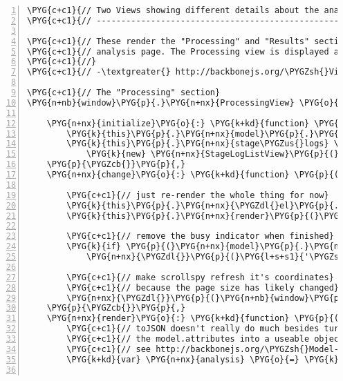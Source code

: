\begin{Verbatim}[commandchars=\\\{\},numbers=left,firstnumber=1,stepnumber=5]
\PYG{c+c1}{// Two Views showing different details about the analysis}
\PYG{c+c1}{// ------------------------------------------------------}

\PYG{c+c1}{// These render the "Processing" and "Results" section on the}
\PYG{c+c1}{// analysis page. The Processing view is displayed above the Results view.}
\PYG{c+c1}{//}
\PYG{c+c1}{// -\textgreater{} http://backbonejs.org/\PYGZsh{}View}

\PYG{c+c1}{// The "Processing" section}
\PYG{n+nb}{window}\PYG{p}{.}\PYG{n+nx}{ProcessingView} \PYG{o}{=} \PYG{n+nx}{Backbone}\PYG{p}{.}\PYG{n+nx}{View}\PYG{p}{.}\PYG{n+nx}{extend}\PYG{p}{(}\PYG{p}{\PYGZob{}}

    \PYG{n+nx}{initialize}\PYG{o}{:} \PYG{k+kd}{function} \PYG{p}{(}\PYG{p}{)} \PYG{p}{\PYGZob{}}
        \PYG{k}{this}\PYG{p}{.}\PYG{n+nx}{model}\PYG{p}{.}\PYG{n+nx}{bind}\PYG{p}{(}\PYG{l+s+s2}{"change"}\PYG{p}{,} \PYG{k}{this}\PYG{p}{.}\PYG{n+nx}{change}\PYG{p}{,} \PYG{k}{this}\PYG{p}{)}\PYG{p}{;}
        \PYG{k}{this}\PYG{p}{.}\PYG{n+nx}{stage\PYGZus{}logs} \PYG{o}{=} \PYG{p}{(}
            \PYG{k}{new} \PYG{n+nx}{StageLogListView}\PYG{p}{(}\PYG{p}{\PYGZob{}}\PYG{n+nx}{model}\PYG{o}{:} \PYG{k}{this}\PYG{p}{.}\PYG{n+nx}{model}\PYG{p}{.}\PYG{n+nx}{stage\PYGZus{}logs}\PYG{p}{\PYGZcb{}}\PYG{p}{)}\PYG{p}{.}\PYG{n+nx}{render}\PYG{p}{(}\PYG{p}{)}\PYG{p}{.}\PYG{n+nx}{el}\PYG{p}{)}\PYG{p}{;}
    \PYG{p}{\PYGZcb{}}\PYG{p}{,}
    \PYG{n+nx}{change}\PYG{o}{:} \PYG{k+kd}{function} \PYG{p}{(}\PYG{n+nx}{model}\PYG{p}{,} \PYG{n+nx}{value}\PYG{p}{,} \PYG{n+nx}{options}\PYG{p}{)} \PYG{p}{\PYGZob{}}

        \PYG{c+c1}{// just re-render the whole thing for now}
        \PYG{k}{this}\PYG{p}{.}\PYG{n+nx}{\PYGZdl{}el}\PYG{p}{.}\PYG{n+nx}{empty}\PYG{p}{(}\PYG{p}{)}\PYG{p}{;}
        \PYG{k}{this}\PYG{p}{.}\PYG{n+nx}{render}\PYG{p}{(}\PYG{p}{)}\PYG{p}{;}

        \PYG{c+c1}{// remove the busy indicator when finished}
        \PYG{k}{if} \PYG{p}{(}\PYG{n+nx}{model}\PYG{p}{.}\PYG{n+nx}{get}\PYG{p}{(}\PYG{l+s+s1}{'finished'}\PYG{p}{)}\PYG{p}{)}
            \PYG{n+nx}{\PYGZdl{}}\PYG{p}{(}\PYG{l+s+s1}{'\PYGZsh{}spinner'}\PYG{p}{)}\PYG{p}{.}\PYG{n+nx}{remove}\PYG{p}{(}\PYG{p}{)}\PYG{p}{;}

        \PYG{c+c1}{// make scrollspy refresh it's coordinates}
        \PYG{c+c1}{// because the page size has likely changed}
        \PYG{n+nx}{\PYGZdl{}}\PYG{p}{(}\PYG{n+nb}{window}\PYG{p}{)}\PYG{p}{.}\PYG{n+nx}{scrollspy}\PYG{p}{(}\PYG{l+s+s1}{'refresh'}\PYG{p}{)}\PYG{p}{;}
    \PYG{p}{\PYGZcb{}}\PYG{p}{,}
    \PYG{n+nx}{render}\PYG{o}{:} \PYG{k+kd}{function} \PYG{p}{(}\PYG{p}{)} \PYG{p}{\PYGZob{}}
        \PYG{c+c1}{// toJSON doesn't really do much besides turning}
        \PYG{c+c1}{// the model.attributes into a useable object}
        \PYG{c+c1}{// see http://backbonejs.org/\PYGZsh{}Model-toJSON}
        \PYG{k+kd}{var} \PYG{n+nx}{analysis} \PYG{o}{=} \PYG{k}{this}\PYG{p}{.}\PYG{n+nx}{model}\PYG{p}{.}\PYG{n+nx}{toJSON}\PYG{p}{(}\PYG{p}{)}\PYG{p}{;}


\end{Verbatim}
